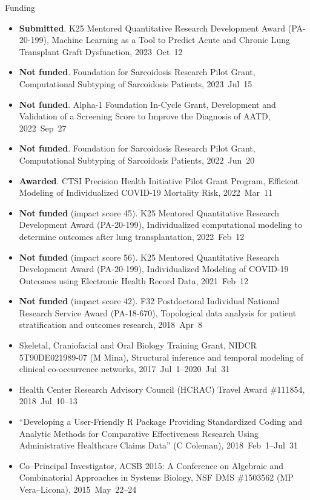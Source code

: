 \documentclass[10pt,a4paper]{article}
\begin{document}
\vspace{.25cm}
{\sc Funding}
\begin{itemize}[label=$\circ$,nolistsep]
\item
{\bfseries Submitted}. K25 Mentored Quantitative Research Development Award (PA-20-199), Machine Learning as a Tool to Predict Acute and Chronic Lung Transplant Graft Dysfunction, 2023~Oct~12
\item
{\bfseries Not funded}. Foundation for Sarcoidosis Research Pilot Grant, Computational Subtyping of Sarcoidosis Patients, 2023~Jul~15
\item
{\bfseries Not funded}. Alpha-1 Foundation In-Cycle Grant, Development and Validation of a Screening Score to Improve the Diagnosis of AATD, 2022~Sep~27
\item
{\bfseries Not funded}. Foundation for Sarcoidosis Research Pilot Grant, Computational Subtyping of Sarcoidosis Patients, 2022~Jun~20
\item
{\bfseries Awarded}. CTSI Precision Health Initiative Pilot Grant Program, Efficient Modeling of Individualized COVID-19 Mortality Risk, 2022~Mar~11
\item
{\bfseries Not funded} (impact score 45). K25 Mentored Quantitative Research Development Award (PA-20-199), Individualized computational modeling to determine outcomes after lung transplantation, 2022~Feb~12
\item
{\bfseries Not funded} (impact score 56). K25 Mentored Quantitative Research Development Award (PA-20-199), Individualized Modeling of COVID-19 Outcomes using Electronic Health Record Data, 2021~Feb~12
\item
{\bfseries Not funded} (impact score 42). F32 Postdoctoral Individual National Research Service Award (PA-18-670), Topological data analysis for patient stratification and outcomes
research, 2018~Apr~8
\item
Skeletal, Craniofacial and Oral Biology Training Grant, NIDCR 5T90DE021989-07 (M Mina), Structural inference and temporal modeling of clinical co-occurrence networks, 2017~Jul~1--2020~Jul~31
\item
Health Center Research Advisory Council (HCRAC) Travel Award \#111854, 2018~Jul~10--13
\item
``Developing a User-Friendly R Package Providing Standardized Coding and Analytic Methods for Comparative Effectiveness Research Using Administrative Healthcare Claims Data'' (C Coleman), 2018~Feb~1--Jul~31
\item
Co--Principal Investigator, ACSB 2015: A Conference on Algebraic and Combinatorial Approaches in Systems Biology, NSF DMS \#1503562 (MP Vera--Licona), 2015~May~22--24
\end{itemize}
\end{document}
